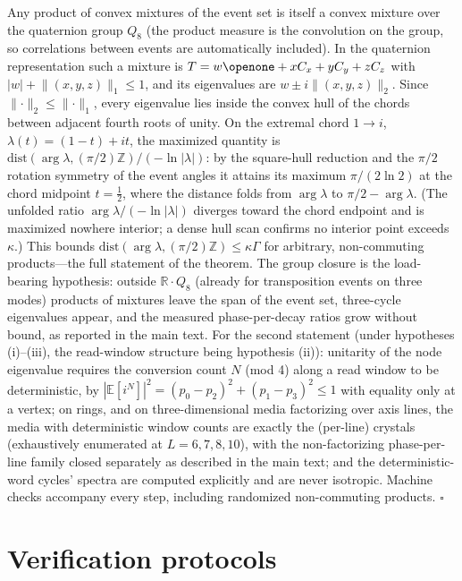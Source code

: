\documentclass[aps,prd,twocolumn,superscriptaddress,nofootinbib,floatfix]{revtex4-2}
\begin{document}
Any product of convex mixtures of the event set is itself a convex mixture
over the quaternion group $Q_8$ (the product measure is the convolution on
the group, so correlations between events are automatically included). In
the quaternion representation such a mixture is
$T=w\openone+x C_x+y C_y+z C_z$ with $|w|+\lVert(x,y,z)\rVert_1\le1$,
and its eigenvalues are $w\pm i\lVert(x,y,z)\rVert_2$. Since
$\lVert\cdot\rVert_2\le\lVert\cdot\rVert_1$, every eigenvalue lies
inside the convex hull of the chords between adjacent fourth roots of
unity. On the extremal chord $1\to i$, $\lambda(t)=(1-t)+it$, the
maximized quantity is
$\mathrm{dist}(\arg\lambda,(\pi/2)\mathbb Z)/(-\ln|\lambda|)$: by the
square-hull reduction and the $\pi/2$ rotation symmetry of the event
angles it attains its maximum $\pi/(2\ln2)$ at the chord midpoint
$t=\tfrac12$, where the distance folds from $\arg\lambda$ to
$\pi/2-\arg\lambda$. (The unfolded ratio $\arg\lambda/(-\ln|\lambda|)$
diverges toward the chord endpoint and is maximized nowhere interior; a
dense hull scan confirms no interior point exceeds $\kappa$.) This bounds
$\mathrm{dist}(\arg\lambda,(\pi/2)\mathbb Z)\le\kappa\Gamma$ for
arbitrary, non-commuting products---the full statement of the theorem.
The group closure is the load-bearing hypothesis: outside
$\mathbb R\cdot Q_8$ (already for transposition events on three modes)
products of mixtures leave the span of the event set, three-cycle
eigenvalues appear, and the measured phase-per-decay ratios grow without
bound, as reported in the main text.
For the second statement (under hypotheses (i)--(iii), the read-window
structure being hypothesis (ii)): unitarity of the node eigenvalue
requires the conversion count $N$ (mod 4) along a read window to be
deterministic, by
$|\mathbb E[i^N]|^2=(p_0-p_2)^2+(p_1-p_3)^2\le1$ with equality only at a
vertex; on rings, and on three-dimensional media factorizing over axis
lines, the media with deterministic window counts are exactly the
(per-line) crystals (exhaustively enumerated at $L=6,7,8,10$), with the
non-factorizing phase-per-line family closed separately as described in
the main text; and the deterministic-word cycles' spectra are computed
explicitly and are never isotropic. Machine checks accompany every step,
including randomized non-commuting products. \hfill$\square$

\section{Verification protocols}
\label{app:verify}
\end{document}

